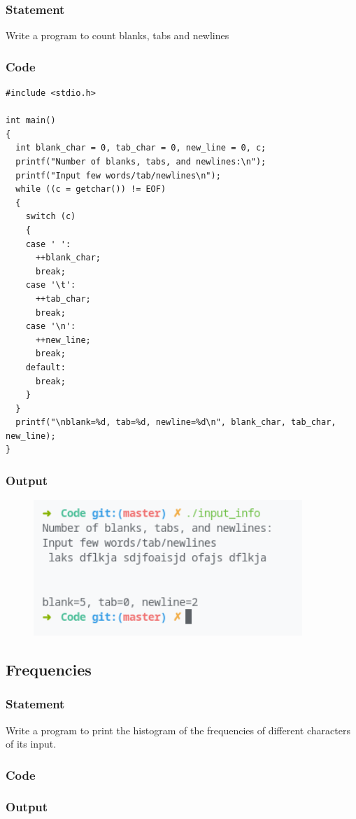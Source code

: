 \subsubsection{Statement}
Write a program to count blanks, tabs and newlines
\subsubsection{Code}
\begin{verbatim} 
#include <stdio.h>

int main()
{
  int blank_char = 0, tab_char = 0, new_line = 0, c;
  printf("Number of blanks, tabs, and newlines:\n");
  printf("Input few words/tab/newlines\n");
  while ((c = getchar()) != EOF)
  {
    switch (c)
    {
    case ' ':
      ++blank_char;
      break;
    case '\t':
      ++tab_char;
      break;
    case '\n':
      ++new_line;
      break;
    default:
      break;
    }
  }
  printf("\nblank=%d, tab=%d, newline=%d\n", blank_char, tab_char, new_line);
}
\end{verbatim}
\subsubsection{Output}
\begin{figure}[!htb]
  \centering
  \includegraphics[width=4in]{Images/input_info.png}
  \label{output:13}
\end{figure}


\pagebreak
\subsection{Frequencies}
\subsubsection{Statement}
Write a program to print the histogram of the frequencies of different characters of its input.
\subsubsection{Code}
\subsubsection{Output}